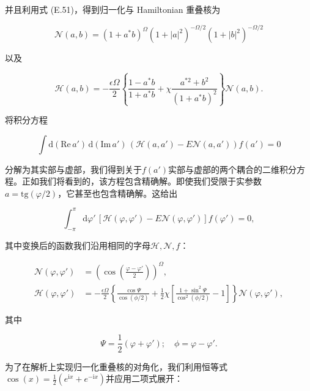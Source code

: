 并且利用式 (E.51)，得到归一化与 Hamiltonian 重叠核为

\begin{equation}
\mathscr{N}(a,b)=(1+a^{*}b)^{\Omega}(1+|a|^{2})^{-\Omega/2}(1+|b|^{2})^{-\Omega/2}\label{eq:lipkin_norm_overlap}
\end{equation}

以及

\begin{equation}
\mathscr{H}(a,b)=-\frac{\epsilon\Omega}{2}\left\{ \frac{1-a^{*}b}{1+a^{*}b}+\chi\frac{a^{*2}+b^{2}}{(1+a^{*}b)^{2}}\right\} \mathscr{N}(a,b).\label{eq:lipkin_hamiltonian_overlap}
\end{equation}

将积分方程

\begin{equation}
\int\mathrm{d}(\mathrm{Re}\,a')\,\mathrm{d}(\mathrm{Im}\,a')\,(\mathscr{H}(a,a')-E\mathscr{N}(a,a'))f(a')=0\label{eq:lipkin_integral_eq_complex}
\end{equation}

分解为其实部与虚部，我们得到关于$f(a')$实部与虚部的两个耦合的二维积分方程。正如我们将看到的，该方程包含精确解。即使我们受限于实参数$a=\mathrm{tg}(\varphi/2)$，它甚至也包含精确解。这给出

\begin{equation}
\int^{\pi}_{-\pi}\mathrm{d}\varphi'\,[\mathscr{H}(\varphi,\varphi')-E\mathscr{N}(\varphi,\varphi')]f(\varphi')=0,\label{eq:lipkin_hw_real_param}
\end{equation}

其中变换后的函数我们沿用相同的字母$\mathscr{H},\mathscr{N},f$：

\begin{align}
\mathscr{N}(\varphi,\varphi') & =\left(\cos\left(\frac{\varphi-\varphi'}{2}\right)\right)^{\Omega},\nonumber \\
\mathscr{H}(\varphi,\varphi') & =-\frac{\epsilon\Omega}{2}\left\{ \frac{\cos\Psi}{\cos(\phi/2)}+\frac{1}{2}\chi\left[\frac{1+\sin^{2}\Psi}{\cos^{2}(\phi/2)}-1\right]\right\} \mathscr{N}(\varphi,\varphi'),\label{eq:lipkin_overlaps_phi}
\end{align}

其中

\begin{equation}
\Psi=\frac{1}{2}(\varphi+\varphi');\quad\phi=\varphi-\varphi'.\label{eq:lipkin_psi_phi_def}
\end{equation}

为了在解析上实现归一化重叠核的对角化，我们利用恒等式$\cos(x)=\frac{1}{2}(e^{\mathrm{i}x}+e^{-\mathrm{i}x})$并应用二项式展开：

